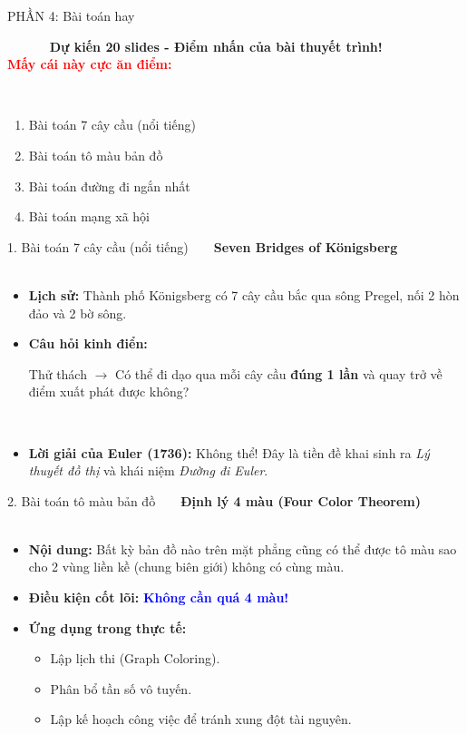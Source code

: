 \documentclass[11pt]{beamer}
\begin{document}
\begin{frame}{ PHẦN 4: Bài toán hay}
    \begin{center}
        \Large \textbf{Dự kiến 20 slides - Điểm nhấn của bài thuyết trình!} \\
 \textcolor{red}{\textbf{Mấy cái này cực ăn điểm:}}
    \end{center}
    
    \vspace{0.5cm}
    \begin{enumerate}
        \item Bài toán 7 cây cầu (nổi tiếng)
        \item Bài toán tô màu bản đồ
        \item Bài toán đường đi ngắn nhất
        \item Bài toán mạng xã hội
    \end{enumerate}
\end{frame}

\begin{frame}{1. Bài toán 7 cây cầu (nổi tiếng)}
    \textbf{Seven Bridges of Königsberg}
    \vspace{0.3cm}
    
    \begin{itemize}
        \item \textbf{Lịch sử:} Thành phố Königsberg có 7 cây cầu bắc qua sông Pregel, nối 2 hòn đảo và 2 bờ sông.
        \item \textbf{Câu hỏi kinh điển:} 
        \begin{alertblock}{Thử thách}
        $\rightarrow$ Có thể đi dạo qua mỗi cây cầu \textbf{đúng 1 lần} và quay trở về điểm xuất phát được không?
        \end{alertblock}
        \pause
        \item \textbf{Lời giải của Euler (1736):} Không thể! Đây là tiền đề khai sinh ra \textit{Lý thuyết đồ thị} và khái niệm \textit{Đường đi Euler}.
    \end{itemize}
\end{frame}

\begin{frame}{2. Bài toán tô màu bản đồ}
    \textbf{Định lý 4 màu (Four Color Theorem)}
    \vspace{0.3cm}
    
    \begin{itemize}
        \item \textbf{Nội dung:} Bất kỳ bản đồ nào trên mặt phẳng cũng có thể được tô màu sao cho 2 vùng liền kề (chung biên giới) không có cùng màu. \pause
        \item \textbf{Điều kiện cốt lõi:} \textcolor{blue}{\textbf{Không cần quá 4 màu!}} \pause
        \item \textbf{Ứng dụng trong thực tế:}
        \begin{itemize}
        \item Lập lịch thi (Graph Coloring).
        \item Phân bổ tần số vô tuyến.
        \item Lập kế hoạch công việc để tránh xung đột tài nguyên.
        \end{itemize}
    \end{itemize}
\end{frame}
\end{document}
